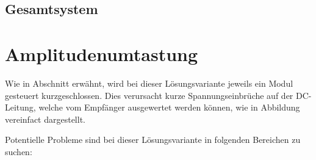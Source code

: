 \subsection{Gesamtsystem}
\label{sec:simu:fsk:inductive:inductive}


\section{Amplitudenumtastung}
\label{sec:simu:ask}

Wie in Abschnitt  erw\"ahnt, wird bei dieser L\"osungsvariante
jeweils   ein   Modul   gesteuert   kurzgeschlossen. Dies   verursacht   kurze
Spannungseinbr\"uche auf  der DC-Leitung,  welche vom  Empf\"anger ausgewertet
werden k\"onnen, wie in Abbildung vereinfact dargestellt.

Potentielle Probleme sind bei  dieser L\"osungsvariante in folgenden Bereichen
zu suchen:

